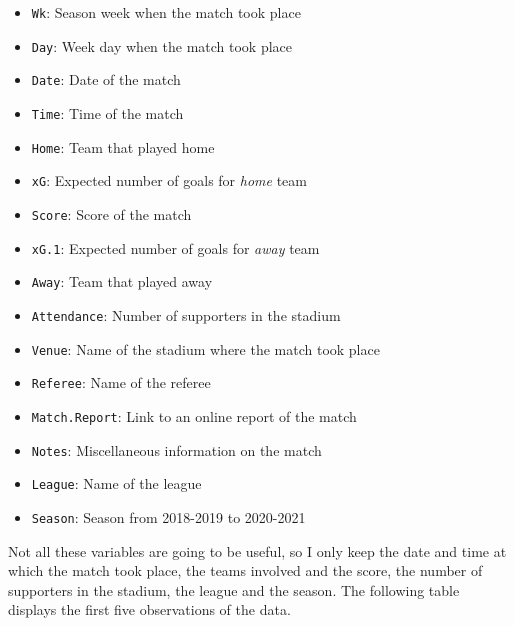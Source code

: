 \documentclass[
]{article}
\providecommand{\tightlist}{%
  \setlength{\itemsep}{0pt}\setlength{\parskip}{0pt}}
\begin{document}
\begin{itemize}
\tightlist
\item
  \texttt{Wk}: Season week when the match took place\\
\item
  \texttt{Day}: Week day when the match took place\\
\item
  \texttt{Date}: Date of the match\\
\item
  \texttt{Time}: Time of the match\\
\item
  \texttt{Home}: Team that played home\\
\item
  \texttt{xG}: Expected number of goals for \emph{home} team\\
\item
  \texttt{Score}: Score of the match\\
\item
  \texttt{xG.1}: Expected number of goals for \emph{away} team\\
\item
  \texttt{Away}: Team that played away\\
\item
  \texttt{Attendance}: Number of supporters in the stadium
\item
  \texttt{Venue}: Name of the stadium where the match took place\\
\item
  \texttt{Referee}: Name of the referee\\
\item
  \texttt{Match.Report}: Link to an online report of the match\\
\item
  \texttt{Notes}: Miscellaneous information on the match\\
\item
  \texttt{League}: Name of the league\\
\item
  \texttt{Season}: Season from 2018-2019 to 2020-2021
\end{itemize}

Not all these variables are going to be useful, so I only keep the date
and time at which the match took place, the teams involved and the
score, the number of supporters in the stadium, the league and the
season. The following table displays the first five observations of the
data.
\end{document}
